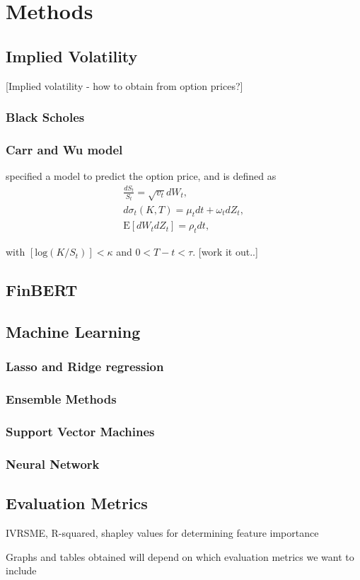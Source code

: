 \section{Methods} \label{methods}

\subsection{Implied Volatility} \label{4_implied_vol}
[Implied volatility - how to obtain from option prices?]

\subsubsection{Black Scholes}
\subsubsection{Carr and Wu model}

 specified a model to predict the option price, and is defined as
\begin{equation}
\begin{aligned}
    \frac{dS_{t}}{S_{t}} = \sqrt{v_{t}}dW_{t}, \\
    d\sigma_{t}(K,T) = \mu_{t}dt + \omega_{t}dZ_{t}, \\
    \text{E}[dW_{t}dZ_{t}] = \rho_{t}dt,
\end{aligned}
\end{equation}

with $[\text{log}(K/S_{t})] < \kappa$ and $0<T-t<\tau$. [work it out..]

\subsection{FinBERT}

\subsection{Machine Learning} \label{4_ML_techniques}

\subsubsection{Lasso and Ridge regression}
\subsubsection{Ensemble Methods}
\subsubsection{Support Vector Machines}
\subsubsection{Neural Network}

\subsection{Evaluation Metrics} \label{4_Evaluation_metrics}
IVRSME, R-squared, shapley values for determining feature importance


Graphs and tables obtained will depend on which evaluation metrics we want to include